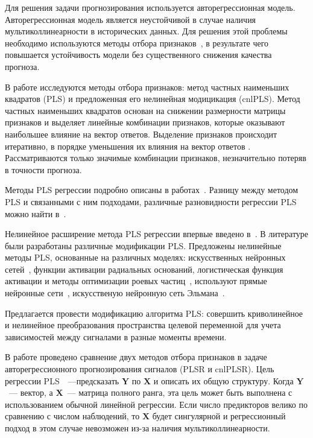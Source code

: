 \documentclass[12pt,twoside]{article}
\newcommand{\bY}{\mathbf{Y}}
\newcommand{\bX}{\mathbf{X}}
\begin{document}
Для решения задачи прогнозирования используется авторегрессионная модель. 
Авторегрессионная модель является неустойчивой в случае наличия мультиколлинеарности в исторических данных. 
Для решения этой проблемы необходимо используются методы отбора признаков~\cite{Li2016}, в результате чего повышается устойчивость модели без существенного снижения качества прогноза.

В работе исследуются методы отбора признаков: метод частных наименьших квадратов (PLS) \cite{Ng2013} и предложенная его нелинейная модицикация (cnlPLS).
Метод частных наименьших квадратов основан на снижении размерности матрицы признаков и выделяет линейные комбинации признаков, которые оказывают наибольшее влияние на вектор ответов. 
Выделение признаков происходит итеративно, в порядке уменьшения их влияния на вектор ответов \cite{Ng2013}. Рассматриваются только значимые комбинации признаков, незначительно потеряв в точности прогноза. 

Методы PLS регрессии подробно описаны в работах~\cite{Geladi1988, Hoskuldsson1988}. 
Разницу между методом PLS и связанными с ним подходами, различные разновидности регрессии PLS можно найти в~\cite{Lehky2014}.

Нелинейное расширение метода PLS регрессии впервые введено в~\cite{Frank1990}. 
В литературе были разработаны различные модификации PLS. 
Предложены нелинейные методы PLS, основанные на различных моделях:  искусственных нейронных сетей~\cite{Mcavovt1992}, функции активации радиальных оснований\cite{Yan2003}, логистическая функция активации и методы оптимизации роевых частиц~\cite{Zhou2007}, используют прямые нейронные сети~\cite{Xuefeng2010}, искусственую нейронную сеть Эльмана~\cite{Bulut2014}.

Предлагается провести модификацию алгоритма PLS: совершить криволинейное и нелинейное преобразования пространства целевой переменной для учета зависимостей между сигналами в разные моменты времени.


В работе проведено сравнение двух методов отбора признаков в задаче авторегрессионного прогнозирования сигналов (PLSR и cnlPLSR). 
Цель регрессии PLS~\cite{Abdi2003}~---предсказать $\bY$ по $\bX$ и описать их общую структуру. 
Когда $\bY$~--- вектор, а $\bX$~--- матрица полного ранга, эта цель может быть выполнена с использованием обычной линейной регрессии. 
Если число предикторов велико по сравнению с числом наблюдений, то $\bX$ будет сингулярной и регрессионный подход в этом случае невозможен из-за наличия мультиколлинеарности.
\end{document}
